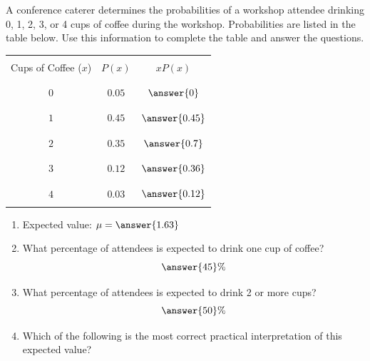 \documentclass{ximera}
\begin{document}
\begin{problem}\label{prob:140hom4prob2}
A conference caterer determines the probabilities of a workshop attendee drinking 0, 1, 2, 3, or 4 cups of coffee during the workshop.  Probabilities are listed in the table below.  Use this information to complete the table and answer the questions.

\begin{center}
\begin{tabular}{|c|c|c|}
 \hline
 &&    \\
 Cups of Coffee ($x$) & $P(x)$& $xP(x)$  \\
 &&   \\
  \hline
  &&  \\
 \quad$0$\quad&$0.05$&$\answer{0}$ \\
  && \\
 \hline
  && \\
 \quad $1$&$0.45$&$\answer{0.45}$  \\
  && \\
 \hline
  && \\
  \quad $2$&$0.35$& $\answer{0.7}$  \\
  && \\
 \hline
  & &\\
 \quad $3$& $0.12$&$\answer{0.36}$  \\
  &&\\
 \hline
  & &\\
 \quad $4$&$0.03$ & $\answer{0.12}$ \\
  &&\\
 \hline
\end{tabular}
\end{center}

\begin{enumerate}
    \item Expected value: $\mu=\answer{1.63}$
    \item What percentage of attendees is expected to drink one cup of coffee?
$$\answer{45}\%$$
\item What percentage of attendees is expected to drink 2 or more cups?
$$\answer{50}\%$$
    \item Which of the following is the most correct practical interpretation of this expected value?
    \begin{multipleChoice}  
   
\end{multipleChoice}
\end{enumerate}

\end{problem}
\end{document}
